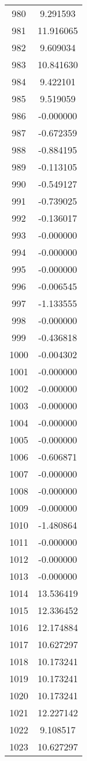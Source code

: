 \documentclass[12pt]{article}
\begin{document}
\begin{longtable}{@{}cc@{}}
980 & 9.291593 \\
981 & 11.916065 \\
982 & 9.609034 \\
983 & 10.841630 \\
984 & 9.422101 \\
985 & 9.519059 \\
986 & -0.000000 \\
987 & -0.672359 \\
988 & -0.884195 \\
989 & -0.113105 \\
990 & -0.549127 \\
991 & -0.739025 \\
992 & -0.136017 \\
993 & -0.000000 \\
994 & -0.000000 \\
995 & -0.000000 \\
996 & -0.006545 \\
997 & -1.133555 \\
998 & -0.000000 \\
999 & -0.436818 \\
1000 & -0.004302 \\
1001 & -0.000000 \\
1002 & -0.000000 \\
1003 & -0.000000 \\
1004 & -0.000000 \\
1005 & -0.000000 \\
1006 & -0.606871 \\
1007 & -0.000000 \\
1008 & -0.000000 \\
1009 & -0.000000 \\
1010 & -1.480864 \\
1011 & -0.000000 \\
1012 & -0.000000 \\
1013 & -0.000000 \\
1014 & 13.536419 \\
1015 & 12.336452 \\
1016 & 12.174884 \\
1017 & 10.627297 \\
1018 & 10.173241 \\
1019 & 10.173241 \\
1020 & 10.173241 \\
1021 & 12.227142 \\
1022 & 9.108517 \\
1023 & 10.627297 \\

\end{longtable}
\end{document}
